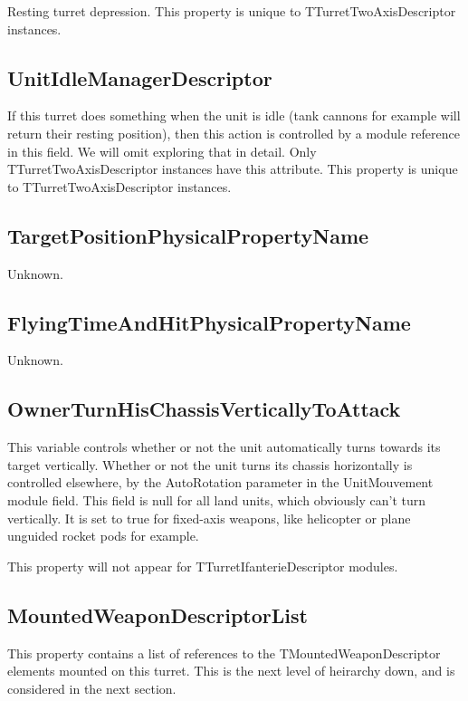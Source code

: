 \documentclass{article}
\begin{document}
Resting turret depression. This property is unique to TTurretTwoAxisDescriptor instances.

\subsection{UnitIdleManagerDescriptor}

If this turret does something when the unit is idle (tank cannons for example will return their resting position), then this action is controlled by a module reference in this field. We will omit exploring that in detail. Only TTurretTwoAxisDescriptor instances have this attribute. This property is unique to TTurretTwoAxisDescriptor instances.

\subsection{TargetPositionPhysicalPropertyName}

Unknown.

\subsection{FlyingTimeAndHitPhysicalPropertyName}

Unknown.

\subsection{OwnerTurnHisChassisVerticallyToAttack}

This variable controls whether or not the unit automatically turns towards its target vertically. Whether or not the unit turns its chassis horizontally is controlled elsewhere, by the AutoRotation parameter in the UnitMouvement module field. This field is null for all land units, which obviously can't turn vertically. It is set to true for fixed-axis weapons, like helicopter or plane unguided rocket pods for example.

This property will not appear for TTurretIfanterieDescriptor modules.

\subsection{MountedWeaponDescriptorList}

This property contains a list of references to the TMountedWeaponDescriptor elements mounted on this turret. This is the next level of heirarchy down, and is considered in the next section.
\end{document}
